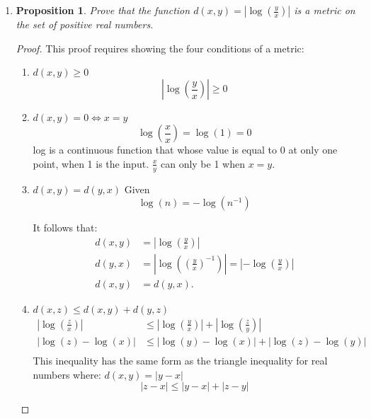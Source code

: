 \documentclass[12pt,a4paper,reqno,parskip=full]{amsart}
\numberwithin{equation}{section}
\theoremstyle{plain}
\newtheorem{proposition}[subsection]{Proposition}
\theoremstyle{definition}
\renewcommand{\leq}{\leqslant}
\renewcommand{\geq}{\geqslant}
\begin{document}
\begin{enumerate}
\begin{proof}
          In all of the cases, and only the cases, where $x \notin A\cap B$ and $x \in S$, is
          $2x^2-5x$ either positive and even or negative and odd.
        \end{proof}

  \item
        \begin{proposition}
          Prove that the function $d(x,y) = \left|\log\left(\frac{y}{x}\right)\right|$
          is a metric on the set of positive real numbers.
        \end{proposition}
        \begin{proof} This proof requires showing the four conditions of a metric:
          \begin{enumerate}
            \item $d(x,y) \geq 0$
                  \[
                    \left|\log\left(\frac{y}{x}\right)\right| \geq 0
                  \]
            \item $d(x,y) = 0 \iff x = y$
                  \[
                    \log\left(\frac{x}{x}\right) = \log(1) = 0
                  \]
                  log is a continuous function that whose value is equal to 0 at only one point, when 1 is the input. $\frac{x}{y}$ can only be 1 when $x = y$.
            \item $d(x,y) = d(y,x)$
                  Given
                  \[\log(n) = -\log(n^{-1})\]

                  It follows that:
                  \begin{align*}
                    d(x,y) & = \left|\log\left(\frac{y}{x}\right)\right|                                                     \\
                    d(y,x) & = \left|\log\left((\frac{y}{x})^{-1}\right)\right| = \left|-\log\left(\frac{y}{x}\right)\right| \\
                    d(x,y) & = d(y,x).
                  \end{align*}
            \item{$d(x,z) \leq d(x,y) + d(y,z)$}
                  \begin{align*}
                    \left|\log\left(\frac{z}{x}\right)\right| & \leq \left|\log\left(\frac{y}{x}\right)\right| + \left|\log\left(\frac{z}{y}\right)\right| \\
                    |\log(z) - \log(x)|                       & \leq |\log(y) - \log(x)| + |\log(z) - \log(y)|                                             \\
                  \end{align*}
                  This inequality has the same form as the triangle inequality for real numbers where: $d(x, y) = |y - x|$
                  \[|z - x|\leq |y - x| + |z - y|\]
          \end{enumerate}
        \end{proof}
\end{enumerate}
\end{document}
